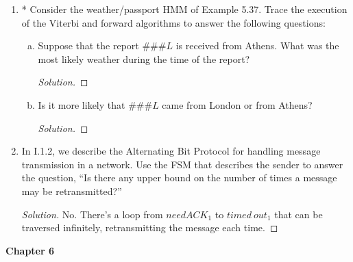 \documentclass[10pt]{article}
\begin{document}
\begin{enumerate}[1)]

\item
* Consider the weather/passport HMM of Example 5.37.  Trace the execution of the Viterbi and forward algorithms to answer the following questions:

\begin{enumerate}[a)]
\item
Suppose that the report $\#\#\#L$ is received from Athens.  What was the most likely weather during the time of the report?

\begin{proof}[Solution]
\end{proof}
 
\item
Is it more likely that $\#\#\#L$ came from London or from Athens?
\begin{proof}[Solution]
\end{proof}
\end{enumerate}

\addtocounter{enumi}{2}

\item
In I.1.2, we describe the Alternating Bit Protocol for handling message transmission in a network.  Use the FSM that describes the sender to answer the question, ``Is there any upper bound on the number of times a message may be retransmitted?''
\begin{proof}[Solution]
No.  There's a loop from $need ACK_1$ to $timed\ out_1$ that can be traversed infinitely, retransmitting the message each time.
\end{proof}

\end{enumerate}

\pagebreak
\textbf{Chapter 6}
\end{document}
